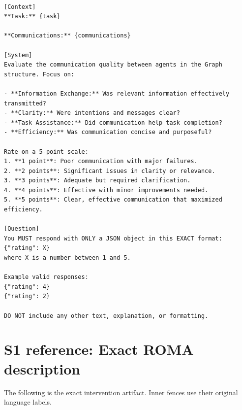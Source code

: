 \documentclass[10pt,letterpaper,twocolumn]{article}
\begin{document}
\begin{Verbatim}[fontsize=\small,breaklines=true,breakanywhere=true]

[Context]
**Task:** {task}

**Communications:** {communications}

[System]
Evaluate the communication quality between agents in the Graph structure. Focus on:

- **Information Exchange:** Was relevant information effectively transmitted?
- **Clarity:** Were intentions and messages clear?
- **Task Assistance:** Did communication help task completion?
- **Efficiency:** Was communication concise and purposeful?

Rate on a 5-point scale:
1. **1 point**: Poor communication with major failures.
2. **2 points**: Significant issues in clarity or relevance.
3. **3 points**: Adequate but required clarification.
4. **4 points**: Effective with minor improvements needed.
5. **5 points**: Clear, effective communication that maximized efficiency.

[Question]
You MUST respond with ONLY a JSON object in this EXACT format:
{"rating": X}
where X is a number between 1 and 5.

Example valid responses:
{"rating": 4}
{"rating": 2}

DO NOT include any other text, explanation, or formatting.
\end{Verbatim}

\section*{S1 reference: Exact ROMA description}

The following is the exact intervention artifact. Inner fences use their original language labels.
\end{document}
